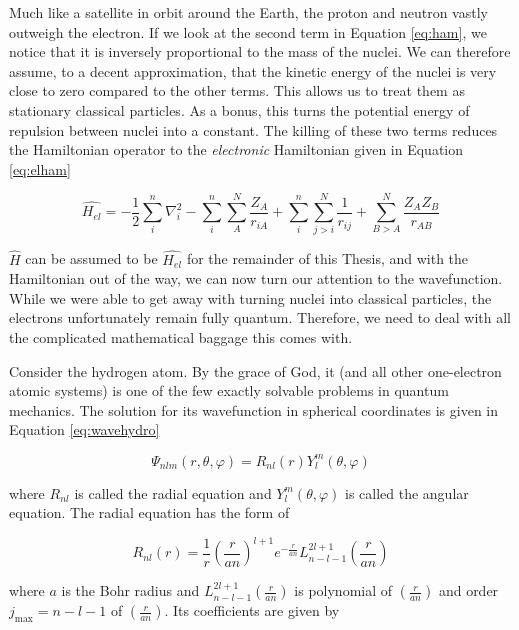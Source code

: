 Much like a satellite in orbit around the Earth, the proton and neutron vastly outweigh the electron. If we look at the second term in Equation \ref{eq:ham}, we notice that it is inversely proportional to the mass of the nuclei. We can therefore assume, to a decent approximation, that the kinetic energy of the nuclei is very close to zero compared to the other terms. This allows us to treat them as stationary classical particles. As a bonus, this turns the potential energy of repulsion between nuclei into a constant. The killing of these two terms reduces the Hamiltonian operator to the \textit{electronic} Hamiltonian given in Equation \ref{eq:elham}

\begin{equation}
\label{eq:elham}
\hat{H_{el}} = -\frac{1}{2}\sum^{n}_{i}\nabla^{2}_{i}  - \sum^{n}_{i}\sum^{N}_{A}\frac{Z_{A}}{r_{iA}} + \sum^{n}_{i}\sum^{N}_{j>i}\frac{1}{r_{ij}} + \sum^{N}_{B>A}\frac{Z_{A}Z_{B}}{r_{AB}}
\end{equation} 

$\hat{H}$ can be assumed to be $\hat{H_{el}}$ for the remainder of this Thesis, and with the Hamiltonian out of the way, we can now turn our attention to the wavefunction. While we were able to get away with turning nuclei into classical particles, the electrons unfortunately remain fully quantum. Therefore, we need to deal with all the complicated mathematical baggage this comes with.

Consider the hydrogen atom. By the grace of God, it (and all other one-electron atomic systems) is one of the few exactly solvable problems in quantum mechanics. The solution for its wavefunction in spherical coordinates is given in Equation \ref{eq:wavehydro}\cite{Griffiths2}

\begin{equation}
\label{eq:wavehydro}
\Psi_{nlm}(r, \theta, \varphi) = R_{nl}(r)Y^{m}_{l}(\theta,\varphi)
\end{equation} 

where $R_{nl}$ is called the radial equation and $Y^{m}_{l}(\theta,\varphi)$ is called the angular equation. The radial equation has the form of

\begin{equation}
\label{eq:wavehydro_R}
R_{nl}(r) = \frac{1}{r}\left(\frac{r}{an}\right)^{l+1}e^{-\frac{r}{an}}L^{2l+1}_{n-l-1}\left(\frac{r}{an}\right)
\end{equation} 

where $a$ is the Bohr radius and $L^{2l+1}_{n-l-1}\left(\frac{r}{an}\right)$ is polynomial of $\left(\frac{r}{an}\right)$ and order $j_{\text{max}}=n-l-1$ of $\left(\frac{r}{an}\right)$. Its coefficients are given by

